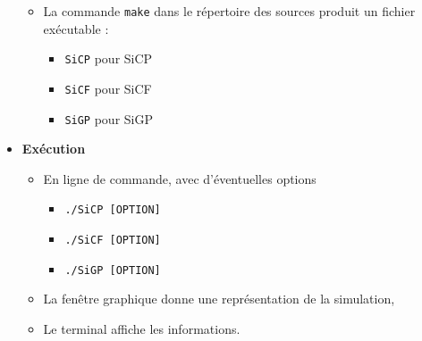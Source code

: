 \begin{itemize}[leftmargin=1cm, label=, itemsep=0pt]
\begin{itemize}[leftmargin=1cm, label=, itemsep=0pt]
	\item La commande \texttt{make} dans le répertoire des sources produit un fichier exécutable :
		\begin{itemize}[leftmargin=1cm, label=, itemsep=0pt]
		\item \texttt{SiCP} pour SiCP
		\item \texttt{SiCF} pour SiCF
		\item \texttt{SiGP} pour SiGP
		\end{itemize}
	\end{itemize}
%
\item {\bf Exécution}
	\begin{itemize}[leftmargin=1cm, label=, itemsep=0pt]
	\item En ligne de commande, avec d'éventuelles options
		\begin{itemize}[leftmargin=1cm, label=, itemsep=0pt]
		\item \texttt{./SiCP [OPTION]}
		\item \texttt{./SiCF [OPTION]}
		\item \texttt{./SiGP [OPTION]}
		\end{itemize}
	\item La fenêtre graphique donne une représentation de la simulation,
	\item Le terminal affiche les informations.
	\end{itemize}
\end{itemize}

